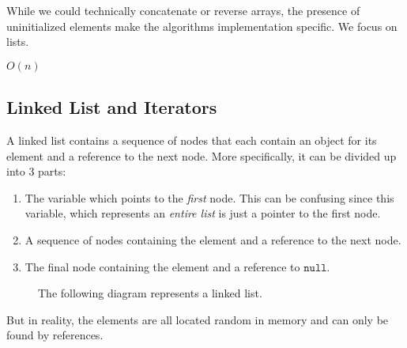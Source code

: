   While we could technically concatenate or reverse arrays, the presence of uninitialized elements make the algorithms implementation specific. We focus on lists. 

  \begin{algo}
    
  \end{algo}

  \begin{algo}
    $O(n)$
  \end{algo}

\subsection{Linked List and Iterators}

  \begin{definition}
    A linked list contains a sequence of nodes that each contain an object for its element and a reference to the next node. More specifically, it can be divided up into 3 parts: 
    \begin{enumerate}
      \item The variable which points to the \textit{first} node. This can be confusing since this variable, which represents an \textit{entire list} is just a pointer to the first node. 
      \item A sequence of nodes containing the element and a reference to the next node. 
      \item The final node containing the element and a reference to $\texttt{null}$. 
    \end{enumerate}

    \begin{figure}[H]
      \centering 
      \caption{The following diagram represents a linked list. } 
      \label{fig:linked_list}
    \end{figure}

    But in reality, the elements are all located random in memory and can only be found by references. 
  \end{definition}


